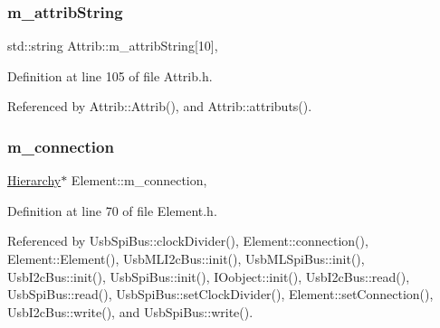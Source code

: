 \mbox{\label{classAttrib_a3414521d7a82476e874b25a5407b5e63}} 
\subsubsection{\texorpdfstring{m\+\_\+attrib\+String}{m\_attribString}}
{\footnotesize\ttfamily std\+::string Attrib\+::m\+\_\+attrib\+String\mbox{[}10\mbox{]}\hspace{0.3cm}{\ttfamily [protected]}, {\ttfamily [inherited]}}



Definition at line 105 of file Attrib.\+h.



Referenced by Attrib\+::\+Attrib(), and Attrib\+::attributs().

\mbox{\label{classElement_abe3de7a5dbbc9a6dd2d7e012e5fdb266}} 
\subsubsection{\texorpdfstring{m\+\_\+connection}{m\_connection}}
{\footnotesize\ttfamily \hyperlink{classHierarchy}{Hierarchy}$\ast$ Element\+::m\+\_\+connection\hspace{0.3cm}{\ttfamily [protected]}, {\ttfamily [inherited]}}



Definition at line 70 of file Element.\+h.



Referenced by Usb\+Spi\+Bus\+::clock\+Divider(), Element\+::connection(), Element\+::\+Element(), Usb\+M\+L\+I2c\+Bus\+::init(), Usb\+M\+L\+Spi\+Bus\+::init(), Usb\+I2c\+Bus\+::init(), Usb\+Spi\+Bus\+::init(), I\+Oobject\+::init(), Usb\+I2c\+Bus\+::read(), Usb\+Spi\+Bus\+::read(), Usb\+Spi\+Bus\+::set\+Clock\+Divider(), Element\+::set\+Connection(), Usb\+I2c\+Bus\+::write(), and Usb\+Spi\+Bus\+::write().

\mbox{\label{classSeqPGA_ab6597288860f5172540059345256f9a9}} 
